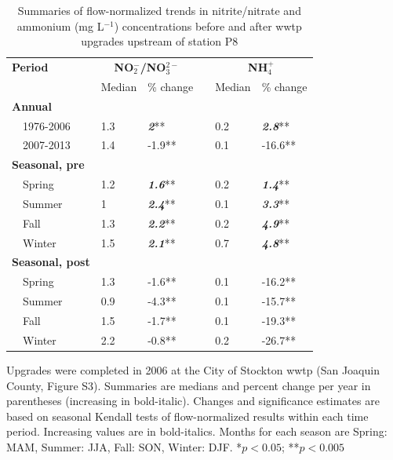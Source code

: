 \documentclass[journal = esthag, manuscript = article]{achemso}\usepackage[]{graphicx}\usepackage[]{color}
\begin{document}
\begin{table}[!tbp]
\caption{Summaries of flow-normalized trends in nitrite/nitrate and ammonium (mg L$^{-1}$) concentrations before and after \ac{wwtp} upgrades upstream of station P8\label{tab:p8chg}} 
\begin{center}
\begin{tabular}{lllcll}
\hline\hline
\multicolumn{1}{l}{\bfseries Period}&\multicolumn{2}{c}{\bfseries NO$_{2}^{-}$/NO$_{3}^{2-}$}&\multicolumn{1}{c}{\bfseries }&\multicolumn{2}{c}{\bfseries NH$_{4}^{+}$}\tabularnewline
\cline{2-3} \cline{5-6}
\multicolumn{1}{l}{}&\multicolumn{1}{c}{Median}&\multicolumn{1}{c}{\% change}&\multicolumn{1}{c}{}&\multicolumn{1}{c}{Median}&\multicolumn{1}{c}{\% change}\tabularnewline
\hline
{\bfseries Annual}&&&&&\tabularnewline
~~1976-2006&1.3&\textit{\textbf{2}}**&&0.2&\textit{\textbf{2.8}}**\tabularnewline
~~2007-2013&1.4&-1.9**&&0.1&-16.6**\tabularnewline
\hline
{\bfseries Seasonal, pre}&&&&&\tabularnewline
~~Spring&1.2&\textit{\textbf{1.6}}**&&0.2&\textit{\textbf{1.4}}**\tabularnewline
~~Summer&1&\textit{\textbf{2.4}}**&&0.1&\textit{\textbf{3.3}}**\tabularnewline
~~Fall&1.3&\textit{\textbf{2.2}}**&&0.2&\textit{\textbf{4.9}}**\tabularnewline
~~Winter&1.5&\textit{\textbf{2.1}}**&&0.7&\textit{\textbf{4.8}}**\tabularnewline
\hline
{\bfseries Seasonal, post}&&&&&\tabularnewline
~~Spring&1.3&-1.6**&&0.1&-16.2**\tabularnewline
~~Summer&0.9&-4.3**&&0.1&-15.7**\tabularnewline
~~Fall&1.5&-1.7**&&0.1&-19.3**\tabularnewline
~~Winter&2.2&-0.8**&&0.2&-26.7**\tabularnewline
\hline
\end{tabular}\end{center}
\footnotesize Upgrades were completed in 2006 at the City of Stockton \ac{wwtp} (San Joaquin County, Figure S3). Summaries are  medians and percent change per year in parentheses (increasing in bold-italic).  Changes and significance estimates are based on seasonal Kendall tests of flow-normalized results within each time period. Increasing values are in bold-italics. Months for each season are Spring: MAM, Summer: JJA, Fall: SON, Winter: DJF. *$p<0.05$; **$p<0.005$\end{table}


\clearpage
\end{document}
